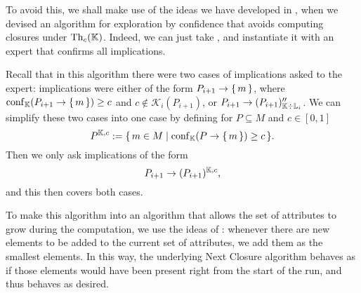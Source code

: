 To avoid this, we shall make use of the ideas we have developed in
, when we devised an algorithm for exploration by confidence that
avoids computing closures under $\operatorname{Th}_{c}({\mathbb{K}})$.  Indeed, we can just take
, and instantiate it with an
expert that confirms all implications.

Recall that in this algorithm there were two cases of implications asked to the expert:
implications were either of the form $P_{i+1} \to {\ensuremath{\{\,m\,\}}}$, where $\operatorname{conf}_{{\mathbb{K}}}(P_{i+1}
\to {\ensuremath{\{\,m\,\}}}) \ge c$ and $c \notin \mathcal{K}_{i}(P_{i+1})$, or $P_{i+1} \to
(P_{i+1})_{{\mathbb{K}} \div {\ensuremath{\mathbb{L}}}_{i}}''$.  We can simplify these two cases into one case by
defining for $P \subseteq M$ and $c \in [0,1]$
\begin{equation*}
  P^{{\mathbb{K}}, c} := {\{\, m \in M \mid \operatorname{conf}_{{\mathbb{K}}}(P \to {\ensuremath{\{\,m\,\}}}) \ge c \,\}}.
\end{equation*}
Then we only ask implications of the form
\begin{equation*}
  P_{i+1} \to (P_{i+1})^{{\mathbb{K}}, c},
\end{equation*}
and this then covers both cases.

To make this algorithm into an algorithm that allows the set of attributes to grow during
the computation, we use the ideas of : whenever there are new
elements to be added to the current set of attributes, we add them as the smallest
elements.  In this way, the underlying Next Closure algorithm behaves as if those elements
would have been present right from the start of the run, and thus behaves as desired.


